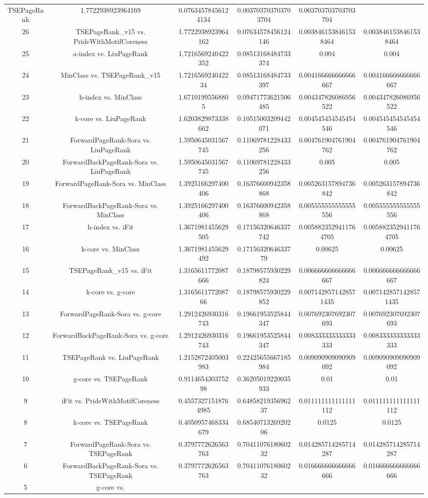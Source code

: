 \documentclass[a4paper,10pt]{article}
\begin{document}
\begin{landscape}
\begin{table}[!htp]
\begin{tabular}{cccccc}
TSEPageRank&1.7722938923964169&0.07634578456124134&0.003703703703703704&0.003703703703703704\\26&TSEPageRank_v15 vs. PrideWithMotifCoreness&1.7722938923964162&0.07634578456124146&0.0038461538461538464&0.0038461538461538464\\25&a-index vs. LiuPageRank&1.7216569240422352&0.08513168484733374&0.004&0.004\\24&MinClass vs. TSEPageRank_v15&1.721656924042234&0.08513168484733397&0.004166666666666667&0.004166666666666667\\23&h-index vs. MinClass&1.67101995568805&0.09471773621506485&0.004347826086956522&0.004347826086956522\\22&k-core vs. LiuPageRank&1.6203829873338662&0.10515003209442071&0.004545454545454546&0.004545454545454546\\21&ForwardPageRank-Sora vs. LiuPageRank&1.5950645031567745&0.11069781228433256&0.004761904761904762&0.004761904761904762\\20&ForwardBackPageRank-Sora vs. LiuPageRank&1.5950645031567745&0.11069781228433256&0.005&0.005\\19&ForwardPageRank-Sora vs. MinClass&1.3925166297400406&0.16376600942358868&0.005263157894736842&0.005263157894736842\\18&ForwardBackPageRank-Sora vs. MinClass&1.3925166297400406&0.16376600942358868&0.005555555555555556&0.005555555555555556\\17&h-index vs. iFit&1.3671981455629505&0.17156320646337742&0.0058823529411764705&0.0058823529411764705\\16&k-core vs. MinClass&1.3671981455629492&0.1715632064633779&0.00625&0.00625\\15&TSEPageRank_v15 vs. iFit&1.3165611772087666&0.18798575930229824&0.006666666666666667&0.006666666666666667\\14&k-core vs. g-core&1.316561177208766&0.18798575930229852&0.0071428571428571435&0.0071428571428571435\\13&ForwardPageRank-Sora vs. g-core&1.2912426930316743&0.19661953525844347&0.007692307692307693&0.007692307692307693\\12&ForwardBackPageRank-Sora vs. g-core&1.2912426930316743&0.19661953525844347&0.008333333333333333&0.008333333333333333\\11&TSEPageRank vs. LiuPageRank&1.2152872405003983&0.22425655667185984&0.009090909090909092&0.009090909090909092\\10&g-core vs. TSEPageRank&0.911465430375298&0.36205019220035933&0.01&0.01\\9&iFit vs. PrideWithMotifCoreness&0.45573271518764985&0.6485821935696237&0.011111111111111112&0.011111111111111112\\8&k-core vs. TSEPageRank&0.4050957468334679&0.6854071326920206&0.0125&0.0125\\7&ForwardPageRank-Sora vs. TSEPageRank&0.3797772626563763&0.7041107618060232&0.014285714285714287&0.014285714285714287\\6&ForwardBackPageRank-Sora vs. TSEPageRank&0.3797772626563763&0.7041107618060232&0.016666666666666666&0.016666666666666666\\5&g-core vs. 
\end{tabular}
\end{table}
\end{landscape}
\end{document}
